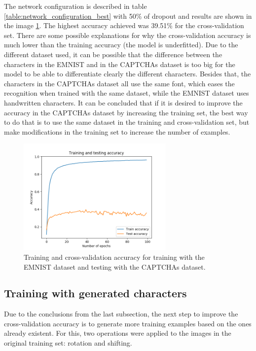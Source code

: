 \documentclass[journal]{IEEEtran}
\begin{document}
The network configuration is described in table \ref{table:network_configuration_best} with 50\% of dropout and results are shown in the image \ref{results_7}. The highest accuracy achieved was 39.51\% for the cross-validation set. There are some possible explanations for why the cross-validation accuracy is much lower than the training accuracy (the model is underfitted). Due to the different dataset used, it can be possible that the difference between the characters in the EMNIST and in the CAPTCHAs dataset is too big for the model to be able to differentiate clearly the different characters. Besides that, the characters in the CAPTCHAs dataset all use the same font, which eases the recognition when trained with the same dataset, while the EMNIST dataset uses handwritten characters. It can be concluded that if it is desired to improve the accuracy in the CAPTCHAs dataset by increasing the training set, the best way to do that is to use the same dataset in the training and cross-validation set, but make modifications in the training set to increase the number of examples.

\begin{figure}[!t]
\centering
\includegraphics[width=3in]{images/test_7}
\caption{Training and cross-validation accuracy for training with the EMNIST dataset and testing with the CAPTCHAs dataset.}
\label{results_7}
\end{figure}

\subsection{Training with generated characters}

Due to the conclusions from the last subsection, the next step to improve the cross-validation accuracy is to generate more training examples based on the ones already existent. For this, two operations were applied to the images in the original training set: rotation and shifting.
\end{document}
